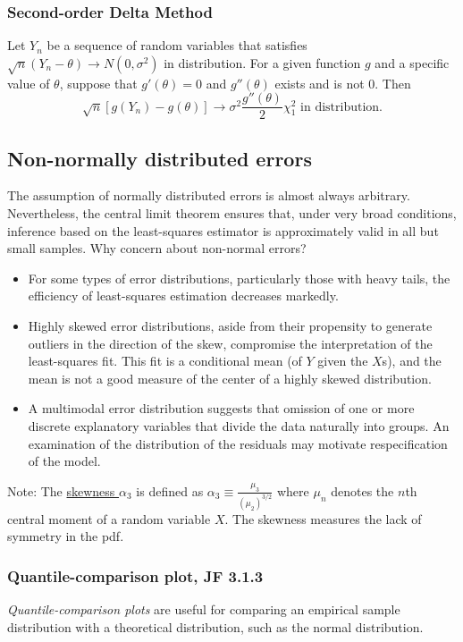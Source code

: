 \subsubsection*{Second-order Delta Method}
Let $Y_n$ be a sequence of random variables that satisfies $\sqrt{n} (Y_n - \theta) \to N(0, \sigma^2)$ in distribution.
For a given function $g$ and a specific value of $\theta$, suppose that $g'(\theta)=0$ and $g''(\theta)$ exists and is not $0$.  Then
$$
\sqrt{n} [ g(Y_n) - g(\theta) ] \to \sigma^2 \frac{g''(\theta)}{2} \chi_1^2  \mbox{ in distribution}.
$$

\subsection*{Non-normally distributed errors}

The assumption of normally distributed errors is almost always arbitrary.  
Nevertheless, the central limit theorem ensures that, under very broad conditions, inference based on the least-squares estimator is approximately valid in all but small samples.
Why concern about non-normal errors?
\begin{itemize}
  \item For some types of error distributions, particularly those with heavy tails, the efficiency of least-squares estimation decreases markedly.
  \item Highly skewed error distributions, aside from their propensity to generate outliers in the direction of the skew, compromise the interpretation of the least-squares fit.
  This fit is a conditional mean (of $Y$ given the $X$s), and the mean is not a good measure of the center of a highly skewed distribution.
  \item A multimodal error distribution suggests that omission of one or more discrete explanatory variables that divide the data naturally into groups.  
  An examination of the distribution of the residuals may motivate respecification of the model.
\end{itemize}

Note: The \underline{skewness $\alpha_3$} is defined as $\alpha_3 \equiv \frac{\mu_3}{(\mu_2)^{3/2}}$ where $\mu_n$ denotes the $n$th central moment of a random variable $X$.
The skewness measures the lack of symmetry in the pdf.

\subsubsection*{Quantile-comparison plot, JF 3.1.3}
{\it Quantile-comparison plots} are useful for comparing an empirical sample distribution with a theoretical distribution, such as the normal distribution.

